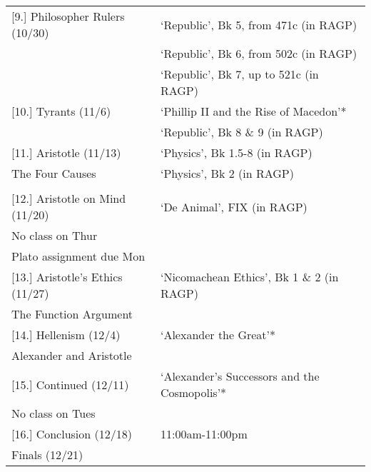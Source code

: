 \documentclass[article,oneside]{memoir}
\begin{document}
\begin{center}
\begin{longtable}{p{4.5cm}p{9cm}}
  							
[9.] Philosopher Rulers (10/30) 		& `Republic', Bk 5, from 471c (in RAGP) \\ 
						 	& `Republic', Bk 6, from 502c (in RAGP) \\ 
						 	& `Republic', Bk 7, up to 521c (in RAGP) \\ [1\baselineskip] \midrule


[10.] Tyrants (11/6)				& `Phillip II and the Rise of Macedon'* \\
			       				& `Republic', Bk 8 \& 9 (in RAGP) \\ [1\baselineskip] \midrule

	

[11.] Aristotle (11/13)		 		& `Physics',  Bk 1.5-8 (in RAGP)  \\ 
The Four Causes				& `Physics', Bk 2 (in RAGP) \\  \\ [1\baselineskip] \midrule
						
					
[12.] Aristotle on Mind (11/20)	 	& `De Animal', FIX  (in RAGP) \\
No class on Thur				& 	 \\ 	
Plato assignment due Mon                & 	 \\ [\baselineskip] \midrule				
			
[13.] Aristotle's Ethics (11/27)		 & `Nicomachean Ethics', Bk 1 \& 2 (in RAGP) \\
The Function Argument			& 	 \\ [\baselineskip] \midrule

[14.] Hellenism (12/4)			&  `Alexander the Great'* \\  
Alexander and Aristotle			&   \\  [1\baselineskip] \midrule


[15.] Continued (12/11) 			& `Alexander's Successors and the Cosmopolis'* \\ 
No class on Tues				& \\ [1\baselineskip] \midrule
	
[16.] Conclusion (12/18) 			& 11:00am-11:00pm \\ 
Finals (12/21)					& \\ [1\baselineskip] \midrule

	

\end{longtable}
\end{center}
\end{document}
